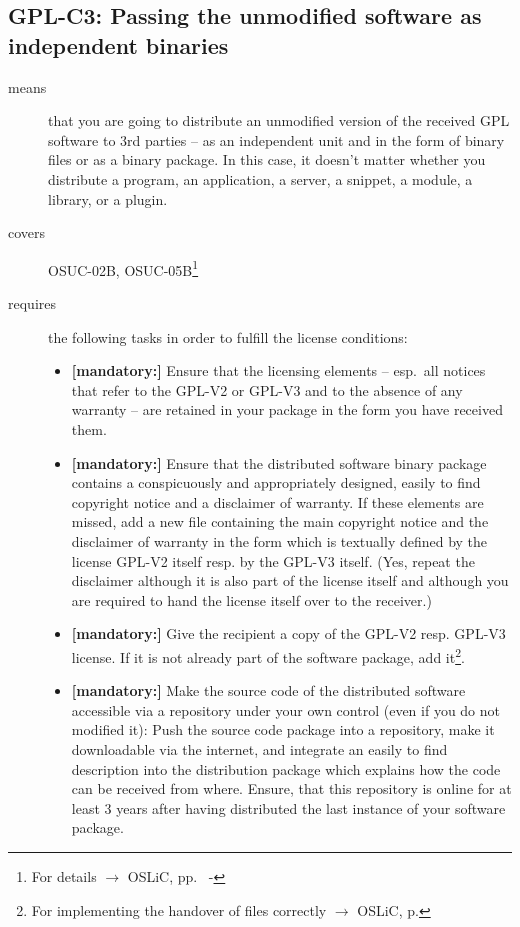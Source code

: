 \subsection{GPL-C3: Passing the unmodified software as independent binaries} 
\label{OSUC-02B-GPL} \label{OSUC-05B-GPL}

\begin{description}


\item[means] that you are going to distribute an unmodified version of the
received GPL software to 3rd parties -- as an independent unit and in the form
of binary files or as a binary package. In this case, it doesn't matter whether
you distribute a program, an application, a server, a snippet, a module, a
library, or a plugin.


\item[covers] OSUC-02B, OSUC-05B\footnote{For details $\rightarrow$ OSLiC, pp.\
\pageref{OSUC-02B-DEF} - \pageref{OSUC-05B-DEF}}

\item[requires] the following tasks in order to fulfill the license conditions:
\begin{itemize}
  
  \item \textbf{[mandatory:]} Ensure that the licensing elements -- esp.\ all
  notices that refer to the GPL-V2 or GPL-V3 and to the absence of any
  warranty -- are retained in your package in the form you have received them.

  \item \textbf{[mandatory:]} Ensure that the distributed software binary
  package contains a conspicuously and appropriately designed, easily to find
  copyright notice and a disclaimer of warranty. If these elements are missed,
  add a new file containing the main copyright notice and the disclaimer of
  warranty in the form which is textually defined by the license GPL-V2 itself
  resp. by the GPL-V3 itself. (Yes, repeat the disclaimer although it is also
  part of the license itself and although you are required to hand the license
  itself over to the receiver.)
  
  \item \textbf{[mandatory:]} Give the recipient a copy of the GPL-V2 resp.
  GPL-V3 license. If it is not already part of the software package, add
  it\footnote{For implementing the handover of files correctly $\rightarrow$
  OSLiC, p. \pageref{DistributingFilesHint}}.
  
  \item \textbf{[mandatory:]} Make the source code of the distributed software
  accessible via a repository under your own control (even if you do not
  modified it): Push the source code package into a repository, make it
  downloadable via the internet, and integrate an easily to find description
  into the distribution package which explains how the code can be received from
  where. Ensure, that this repository is online for at least 3 years after
  having distributed the last instance of your software package.
  

\end{itemize}
\end{description}
